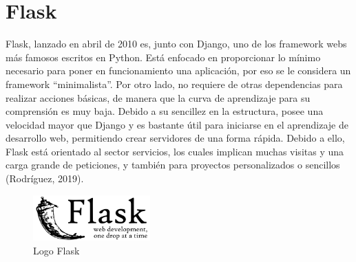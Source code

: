 \section{Flask}

Flask, lanzado en abril de 2010 es, junto con Django, uno de los framework webs más famosos escritos en Python.\newline
Está enfocado en proporcionar lo mínimo necesario para poner en funcionamiento una aplicación, por eso se le considera un framework “minimalista”. Por otro lado, no requiere de otras dependencias para realizar acciones básicas, de manera que la curva de aprendizaje para su comprensión es muy baja. Debido a su sencillez en la estructura, posee una velocidad mayor que Django y es bastante útil para iniciarse en el aprendizaje de desarrollo web, permitiendo crear servidores de una forma rápida. Debido a ello, Flask está orientado al sector servicios, los cuales implican muchas visitas y una carga grande de peticiones, y también para proyectos personalizados o sencillos (Rodríguez, 2019).
\begin{figure}[h!]
  \centering
    \includegraphics[width=0.4\textwidth]{img/flask.png}
  \caption{Logo Flask}
  \label{Flask}
\end{figure}